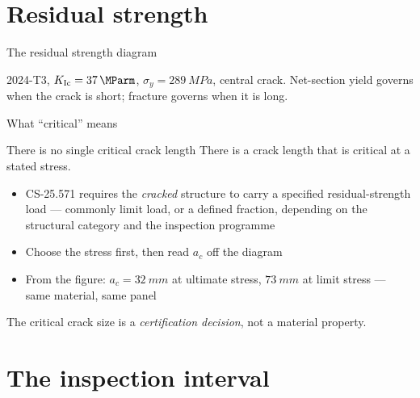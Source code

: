 \documentclass[aspectratio=169,10pt]{beamer}
\begin{document}
\section{Residual strength}

\begin{frame}{The residual strength diagram}
\centering

\vspace{-4pt}

\footnotesize 2024-T3, $K_{\mathrm{Ic}}=\SI{37}{\MParm}$, $\sigma_y=\SI{289}{MPa}$, central crack. Net-section yield governs when the crack is short; fracture governs when it is long.
\end{frame}

\begin{frame}{What ``critical'' means}
\begin{alertblock}{There is no single critical crack length}
There is a crack length that is critical \alert{at a stated stress}.
\end{alertblock}
\begin{itemize}
  \item CS-25.571 requires the \emph{cracked} structure to carry a specified residual-strength load --- commonly limit load, or a defined fraction, depending on the structural category and the inspection programme
  \item Choose the stress first, then read $a_c$ off the diagram
  \item From the figure: $a_c=\SI{32}{mm}$ at ultimate stress, $\SI{73}{mm}$ at limit stress --- \alert{same material, same panel}
\end{itemize}
\vspace{2pt}
\begin{block}{}
The critical crack size is a \emph{certification decision}, not a material property.
\end{block}
\end{frame}

\section{The inspection interval}
\end{document}
